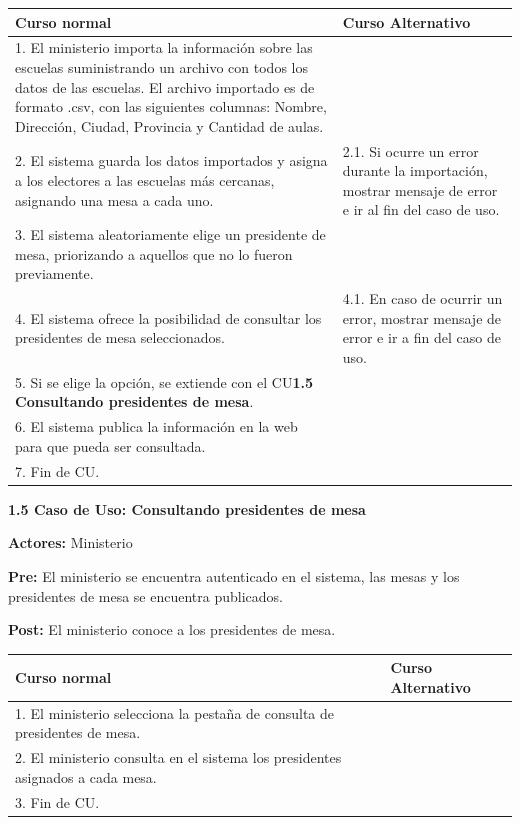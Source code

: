 \begin{table}[h!]
	
 \begin{tabular}{|p{7.5cm} | p{7.5cm}|} 
 \hline
 \textbf{Curso normal} & \textbf{Curso Alternativo} \\
 \hline

1. El ministerio importa la información sobre las escuelas suministrando un archivo con todos los datos de las escuelas. El archivo importado es de formato .csv, con las siguientes columnas: Nombre, Dirección, Ciudad, Provincia y Cantidad de aulas. & \\
\hline

2. El sistema guarda los datos importados y asigna a los electores a las escuelas más cercanas, asignando una mesa a cada uno. &
2.1. Si ocurre un error durante la importación, mostrar mensaje de error e ir al fin del caso de uso. \\
\hline
3. El sistema aleatoriamente elige un presidente de mesa, priorizando a aquellos que no lo fueron previamente. & \\
\hline

4. El sistema ofrece la posibilidad de consultar los presidentes de mesa seleccionados. &
4.1. En caso de ocurrir un error, mostrar mensaje de error e ir a fin del caso de uso. \\
\hline
5. Si se elige la opción, se extiende con el CU\textbf{1.5 Consultando presidentes de mesa}. & \\
\hline

6. El sistema publica la información en la web para que pueda ser consultada. & \\
\hline

7. Fin de CU. & \\
\hline

 \end{tabular}

\end{table}






\textbf{1.5 Caso de Uso: Consultando presidentes de mesa}

\textbf{Actores:} Ministerio 

\textbf{Pre:} El ministerio se encuentra autenticado en el sistema, las mesas y los presidentes de mesa se encuentra publicados.

\textbf{Post:} El ministerio conoce a los presidentes de mesa.
\begin{table}[h!]
	
 \begin{tabular}{|p{7.5cm} | p{7.5cm}|} 
 \hline
 \textbf{Curso normal} & \textbf{Curso Alternativo} \\
 \hline

1. El ministerio selecciona la pestaña de consulta de presidentes de mesa. & \\
\hline
2. El ministerio consulta en el sistema los presidentes asignados a cada mesa. & \\
\hline
3. Fin de CU. & \\
\hline
 \end{tabular}

\end{table}

